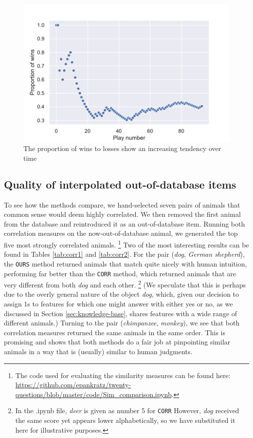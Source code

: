 \documentclass[11pt,a4paper]{article}
\begin{document}
\begin{figure}
    \centering
    \includegraphics[scale = .5]{graphics/stats-eval.pdf}
    \caption{The proportion of wins to losses show an increasing tendency over time}
    \label{fig:win-over-time}
\end{figure}

\subsection{Quality of interpolated out-of-database items}

To see how the methods compare, we hand-selected seven pairs of animals that common sense would deem highly correlated. We then removed the first animal from the database and reintroduced it as an out-of-database item. Running both correlation measures on the now-out-of-database animal, we generated the top five most strongly correlated animals.%
    \footnote{The code used for evaluating the similarity measures can be found here:  \url{https://github.com/epankratz/twenty-questions/blob/master/code/Sim_comparison.ipynb}.}
Two of the most interesting results can be found in Tables \ref{tab:corr1} and \ref{tab:corr2}.
For the pair (\textit{dog}, \textit{German shepherd}), the \texttt{OURS} method returned animals that match quite nicely with human intuition, performing far better than the \texttt{CORR} method, which returned animals that are very different from both \textit{dog} and each other.%
    \footnote{In the .ipynb file, \textit{deer} is given as number 5 for \texttt{CORR} However, \textit{dog} received the same score yet appears lower alphabetically, so we have substituted it here for illustrative purposes.}
(We speculate that this is perhaps due to the overly general nature of the object \textit{dog}, which, given our decision to assign 1s to features for which one might answer with either yes or no, as we discussed in Section \ref{sec:knowledge-base}, shares features with a wide range of different animals.) 
Turning to the pair (\textit{chimpanzee}, \textit{monkey}), we see that both correlation measures returned the same animals in the same order. 
This is promising and shows that both methods do a fair job at pinpointing similar animals in a way that is (usually) similar to human judgments.
\end{document}
